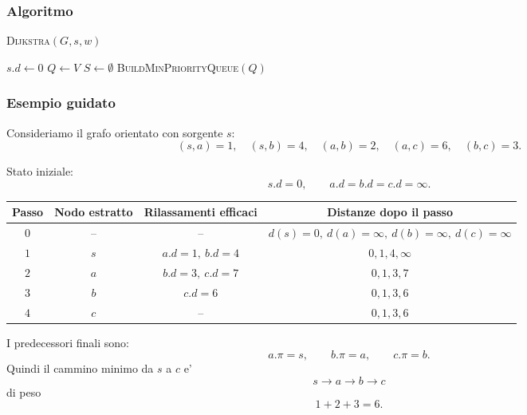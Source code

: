 \subsubsection{Algoritmo}
\begin{algorithm}[H]
	\caption{\textsc{Dijkstra}$(G,s,w)$}
	$s.d\gets 0$\;
	$Q\gets V$\;
	$S\gets\emptyset$\;
	\textsc{BuildMinPriorityQueue}$(Q)$
\end{algorithm}

\subsubsection{Esempio guidato}
Consideriamo il grafo orientato con sorgente $s$:
\[
(s,a)=1,\quad (s,b)=4,\quad (a,b)=2,\quad (a,c)=6,\quad (b,c)=3.
\]

Stato iniziale:
\[
s.d=0,\qquad a.d=b.d=c.d=\infty.
\]

\begin{center}
\begin{tabular}{c|c|c|c}
Passo & Nodo estratto & Rilassamenti efficaci & Distanze dopo il passo \\
\hline
$0$ & -- & -- & $d(s)=0,\ d(a)=\infty,\ d(b)=\infty,\ d(c)=\infty$ \\
$1$ & $s$ & $a.d=1,\ b.d=4$ & $0,1,4,\infty$ \\
$2$ & $a$ & $b.d=3,\ c.d=7$ & $0,1,3,7$ \\
$3$ & $b$ & $c.d=6$ & $0,1,3,6$ \\
$4$ & $c$ & -- & $0,1,3,6$
\end{tabular}
\end{center}

I predecessori finali sono:
\[
a.\pi=s,\qquad b.\pi=a,\qquad c.\pi=b.
\]
Quindi il cammino minimo da $s$ a $c$ e'
\[
s\to a\to b\to c
\]
di peso
\[
1+2+3=6.
\]

